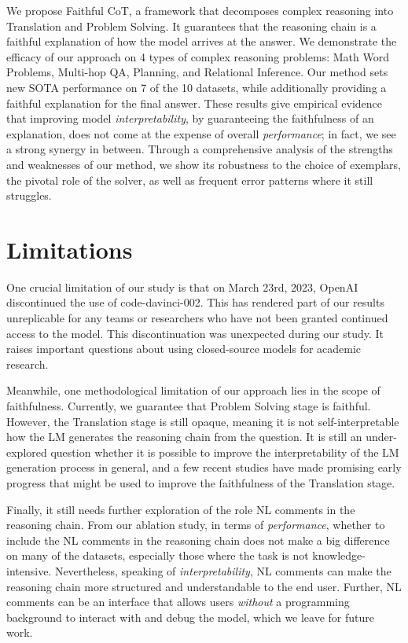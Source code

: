 \documentclass[11pt]{article}
\begin{document}
We propose Faithful CoT, a framework that decomposes complex reasoning into Translation and Problem Solving. 
It guarantees that the reasoning chain is a faithful explanation of how the model arrives at the answer. We demonstrate the efficacy of our approach on 4 types of complex reasoning problems: Math Word Problems, Multi-hop QA, Planning, and Relational Inference. Our method sets new SOTA performance on 7 of the 10 datasets, while additionally providing a faithful explanation for the final answer. These results give empirical evidence that improving model \textit{interpretability}, by guaranteeing the faithfulness of an explanation, does not come at the expense of overall \textit{performance}; in fact, we see a strong synergy in between. Through a comprehensive analysis of the strengths and weaknesses of our method, we show its robustness to the choice of exemplars, the pivotal role of the solver, as well as frequent error patterns where it still struggles.

\section*{Limitations}
\label{sec:limitations}

One crucial limitation of our study is that on March 23rd, 2023, OpenAI discontinued the use of code-davinci-002. This has rendered part of our results unreplicable for any teams or researchers who have not been granted continued access to the model. This discontinuation was unexpected during our study. It raises important questions about using closed-source models for academic research.

Meanwhile, one methodological limitation of our approach lies in the scope of faithfulness. Currently, we guarantee that Problem Solving stage is faithful. However, the Translation stage is still opaque, meaning it is not self-interpretable how the LM generates the reasoning chain from the question. It is still an under-explored question whether it is possible to improve the interpretability of the LM generation process in general, and a few recent studies have made promising early progress \cite{yin2022interpreting, sarti2023inseq} that might be used to improve the faithfulness of the Translation stage. 

Finally, it still needs further exploration of the role NL comments in the reasoning chain. From our ablation study, in terms of \textit{performance}, whether to include the NL comments in the reasoning chain does not make a big difference on many of the datasets, especially those where the task is not knowledge-intensive. Nevertheless, speaking of \textit{interpretability}, NL comments can make the reasoning chain more structured and understandable to the end user. Further, NL comments can be an interface that allows users \textit{without} a programming background to interact with and debug the model, which we leave for future work.
\end{document}

